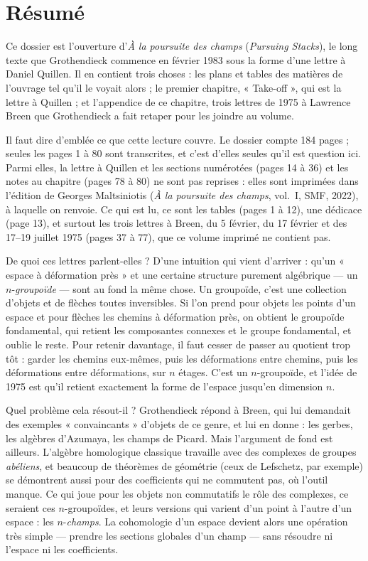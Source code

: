 \documentclass[11pt,a4paper]{article}
\begin{document}
\section*{Résumé}

\begin{resume}
Ce dossier est l'ouverture d'\emph{À la poursuite des champs}
(\emph{Pursuing Stacks}), le long texte que Grothendieck commence en février
1983 sous la forme d'une lettre à Daniel Quillen. Il en contient trois
choses : les plans et tables des matières de l'ouvrage tel qu'il le voyait
alors ; le premier chapitre, « Take-off », qui est la lettre à Quillen ; et
l'appendice de ce chapitre, trois lettres de 1975 à Lawrence Breen que
Grothendieck a fait retaper pour les joindre au volume.

Il faut dire d'emblée ce que cette lecture couvre. Le dossier compte 184
pages ; seules les pages 1 à 80 sont transcrites, et c'est d'elles seules
qu'il est question ici. Parmi elles, la lettre à Quillen et les sections
numérotées (pages 14 à 36) et les notes au chapitre (pages 78 à 80) ne sont
pas reprises : elles sont imprimées dans l'édition de Georges Maltsiniotis
(\emph{À la poursuite des champs}, vol.~I, SMF, 2022), à laquelle on renvoie.
Ce qui est lu, ce sont les tables (pages 1 à 12), une dédicace (page 13), et
surtout les trois lettres à Breen, du 5 février, du 17 février et des 17--19
juillet 1975 (pages 37 à 77), que ce volume imprimé ne contient pas.

De quoi ces lettres parlent-elles ? D'une intuition qui vient d'arriver :
qu'un « espace à déformation près » et une certaine structure purement
algébrique --- un $n$-\emph{groupoïde} --- sont au fond la même chose. Un
groupoïde, c'est une collection d'objets et de flèches toutes inversibles.
Si l'on prend pour objets les points d'un espace et pour flèches les chemins
à déformation près, on obtient le groupoïde fondamental, qui retient les
composantes connexes et le groupe fondamental, et oublie le reste. Pour
retenir davantage, il faut cesser de passer au quotient trop tôt : garder les
chemins eux-mêmes, puis les déformations entre chemins, puis les déformations
entre déformations, sur $n$ étages. C'est un $n$-groupoïde, et l'idée de 1975
est qu'il retient exactement la forme de l'espace jusqu'en dimension $n$.

Quel problème cela résout-il ? Grothendieck répond à Breen, qui lui demandait
des exemples « convaincants » d'objets de ce genre, et lui en donne : les
gerbes, les algèbres d'Azumaya, les champs de Picard. Mais l'argument de fond
est ailleurs. L'algèbre homologique classique travaille avec des complexes
de groupes \emph{abéliens}, et beaucoup de théorèmes de géométrie (ceux de
Lefschetz, par exemple) se démontrent aussi pour des coefficients qui ne
commutent pas, où l'outil manque. Ce qui joue pour les objets non
commutatifs le rôle des complexes, ce seraient ces $n$-groupoïdes, et leurs
versions qui varient d'un point à l'autre d'un espace : les
$n$-\emph{champs}. La cohomologie d'un espace devient alors une opération
très simple --- prendre les sections globales d'un champ --- sans résoudre ni
l'espace ni les coefficients.


\end{resume}
\end{document}

